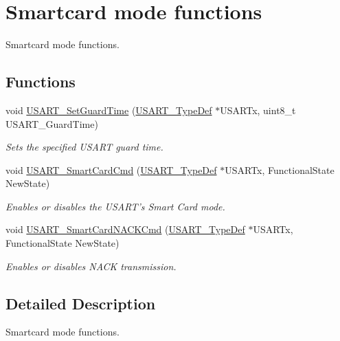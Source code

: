\hypertarget{group___u_s_a_r_t___group6}{}\section{Smartcard mode functions}
\label{group___u_s_a_r_t___group6}


Smartcard mode functions.  


\subsection*{Functions}
\begin{DoxyCompactItemize}
\item 
void \hyperlink{group___u_s_a_r_t___group6_gac4a35c6acd71ae7e0d67c1f03f0a8777}{U\+S\+A\+R\+T\+\_\+\+Set\+Guard\+Time} (\hyperlink{struct_u_s_a_r_t___type_def}{U\+S\+A\+R\+T\+\_\+\+Type\+Def} $\ast$U\+S\+A\+R\+Tx, uint8\+\_\+t U\+S\+A\+R\+T\+\_\+\+Guard\+Time)
\begin{DoxyCompactList}\small\item\em Sets the specified U\+S\+A\+R\+T guard time. \end{DoxyCompactList}\item 
void \hyperlink{group___u_s_a_r_t___group6_gabd1347e244c623447151ba3a5e986c5f}{U\+S\+A\+R\+T\+\_\+\+Smart\+Card\+Cmd} (\hyperlink{struct_u_s_a_r_t___type_def}{U\+S\+A\+R\+T\+\_\+\+Type\+Def} $\ast$U\+S\+A\+R\+Tx, Functional\+State New\+State)
\begin{DoxyCompactList}\small\item\em Enables or disables the U\+S\+A\+R\+T's Smart Card mode. \end{DoxyCompactList}\item 
void \hyperlink{group___u_s_a_r_t___group6_ga62e22f47e38aa53f2edce8771f7a5dfa}{U\+S\+A\+R\+T\+\_\+\+Smart\+Card\+N\+A\+C\+K\+Cmd} (\hyperlink{struct_u_s_a_r_t___type_def}{U\+S\+A\+R\+T\+\_\+\+Type\+Def} $\ast$U\+S\+A\+R\+Tx, Functional\+State New\+State)
\begin{DoxyCompactList}\small\item\em Enables or disables N\+A\+C\+K transmission. \end{DoxyCompactList}\end{DoxyCompactItemize}


\subsection{Detailed Description}
Smartcard mode functions. 

